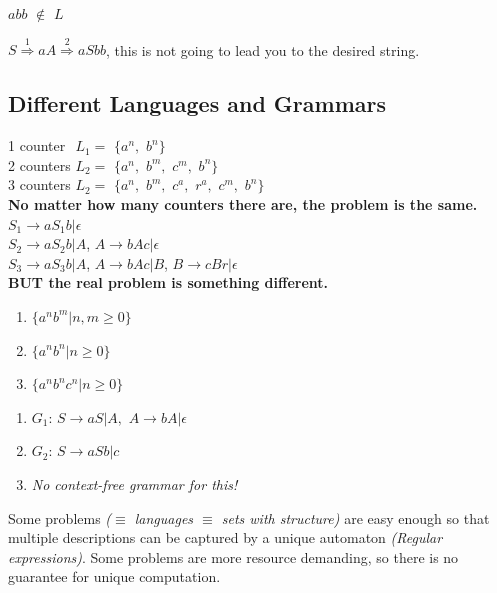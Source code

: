 \documentclass[12pt,a4paper]{article}
\begin{document}
\noindent $abb$ $\notin$ $L$\\
{$S\overset{1}{\Rightarrow}aA\overset{2}{\Rightarrow}aSbb$, this is not going to lead you to the desired string.

\subsection{Different Languages and Grammars}
1 counter\textcolor{white}{s} $L_{1}=$ $\lbrace a^{n},$ $b^{n}\rbrace$\\
2 counters $L_{2}=$ $\lbrace a^{n},$ $b^{m},$ $c^{m},$ $b^{n}\rbrace$\\
3 counters $L_{2}=$ $\lbrace a^{n},$ $b^{m},$ $c^{a},$ $r^{a},$ $c^{m},$ $b^{n}\rbrace$\\

\textbf{No matter how many counters there are, the problem is the same.}\\

\noindent $S_{1}\rightarrow aS_{1}b|\epsilon$\\
$S_{2}\rightarrow aS_{2}b|A$, $A\rightarrow bAc | \epsilon$\\
$S_{3}\rightarrow aS_{3}b |A$, $A\rightarrow bAc| B$, $B\rightarrow cBr | \epsilon$\\

\textbf{BUT the real problem is something different.}\\

\begin{enumerate}
\item $\lbrace a^{n}b^{m}|n,m\geq0\rbrace$
\item $\lbrace a^{n}b^{n}|n\geq0\rbrace$
\item $\lbrace a^{n}b^{n}c^{n}|n\geq0\rbrace$
\end{enumerate}

\begin{enumerate}
\item $G_{1}$: $S\rightarrow aS|A,$ $A\rightarrow bA|\epsilon$
\item $G_{2}$: $S\rightarrow aSb|c$
\item \emph{No context-free grammar for this!}
\end{enumerate}

Some problems \emph{($\equiv$ languages $\equiv$ sets with structure)} are easy enough so that multiple descriptions can be captured by a unique automaton \emph{(Regular expressions)}. Some problems are more resource demanding, so there is no guarantee for unique computation.\\

}
\end{document}
